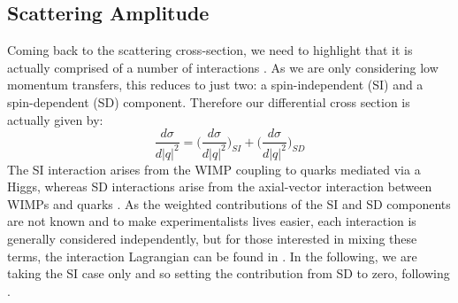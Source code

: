 \subsection{Scattering Amplitude}
\par
Coming back to the scattering cross-section, we need to highlight that it is actually comprised of a number of interactions \cite{wimp_lagrangian_ref}.
As we are only considering low momentum transfers, this reduces to just two: a spin-independent (SI) and a spin-dependent (SD) component.
Therefore our differential cross section is actually given by:
\begin{equation}
    \frac{d\sigma}{d|q|^2} = \bigg(\frac{d\sigma}{d|q|^2}\bigg)_{SI} + \bigg(\frac{d\sigma}{d|q|^2}\bigg)_{SD}
\end{equation}
The SI interaction arises from the WIMP coupling to quarks mediated via a Higgs, whereas SD interactions arise from the axial-vector interaction between WIMPs and quarks \cite{supersymmetric_dark_matter_ref}.
As the weighted contributions of the SI and SD components are not known and to make experimentalists lives easier, each interaction is generally considered independently, but for those interested in mixing these terms, the interaction Lagrangian can be found in \cite{wimp_lagrangian_ref}.
In the following, we are taking the SI case only and so setting the contribution from SD to zero, following \cite{supersymetry_wimpy_again_ref}.

